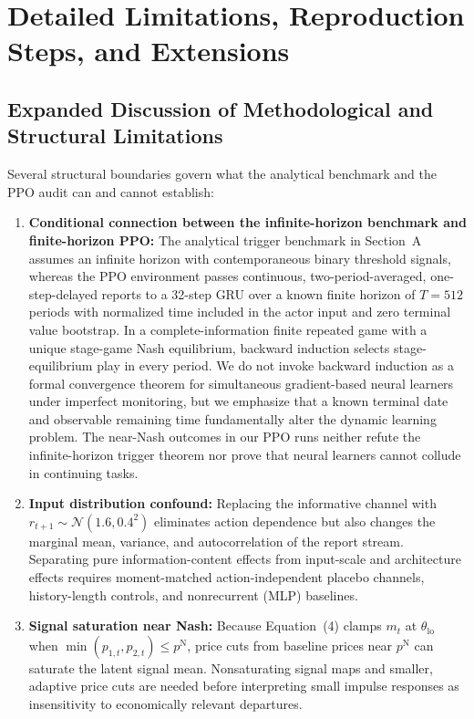 \section{Detailed Limitations, Reproduction Steps, and Extensions}

\subsection{Expanded Discussion of Methodological and Structural Limitations}

Several structural boundaries govern what the analytical benchmark and the PPO audit can and cannot establish:
\begin{enumerate}
\item \textbf{Conditional connection between the infinite-horizon benchmark and finite-horizon PPO:} The analytical trigger benchmark in Section~A assumes an infinite horizon with contemporaneous binary threshold signals, whereas the PPO environment passes continuous, two-period-averaged, one-step-delayed reports to a 32-step GRU over a known finite horizon of $T=512$ periods with normalized time included in the actor input and zero terminal value bootstrap. In a complete-information finite repeated game with a unique stage-game Nash equilibrium, backward induction selects stage-equilibrium play in every period. We do not invoke backward induction as a formal convergence theorem for simultaneous gradient-based neural learners under imperfect monitoring, but we emphasize that a known terminal date and observable remaining time fundamentally alter the dynamic learning problem. The near-Nash outcomes in our PPO runs neither refute the infinite-horizon trigger theorem nor prove that neural learners cannot collude in continuing tasks.
\item \textbf{Input distribution confound:} Replacing the informative channel with $r_{t+1}\sim\mathcal{N}(1.6,0.4^2)$ eliminates action dependence but also changes the marginal mean, variance, and autocorrelation of the report stream. Separating pure information-content effects from input-scale and architecture effects requires moment-matched action-independent placebo channels, history-length controls, and nonrecurrent (MLP) baselines.
\item \textbf{Signal saturation near Nash:} Because Equation~(4) clamps $m_t$ at $\theta_{\mathrm{lo}}$ when $\min(p_{1,t},p_{2,t})\leq p^{\mathrm{N}}$, price cuts from baseline prices near $p^{\mathrm{N}}$ can saturate the latent signal mean. Nonsaturating signal maps and smaller, adaptive price cuts are needed before interpreting small impulse responses as insensitivity to economically relevant departures.

\end{enumerate}
